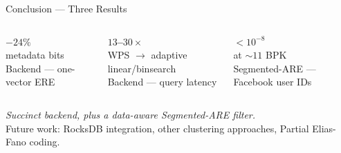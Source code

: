 \begin{frame}{Conclusion — Three Results}
  \begin{columns}[c,onlytextwidth]
    \centering
    {\Huge\bfseries\textcolor{thAccent1}{$-24\%$}}\\[0.4em]
    {\small metadata bits}\\
    {\footnotesize Backend — one-vector ERE}

    \centering
    {\Huge\bfseries\textcolor{thAccent2}{$13$--$30\times$}}\\[0.4em]
    {\small WPS $\to$ adaptive linear/binsearch}\\
    {\footnotesize Backend — query latency}

    \centering
    {\Huge\bfseries\textcolor{thScanARE}{$<\!10^{-8}$}}\\[0.4em]
    {\small at $\sim 11$ BPK}\\
    {\footnotesize Segmented-ARE — Facebook user IDs}
  \end{columns}
  \vspace{1em}
  \centering
  \emph{Succinct backend, plus a data-aware Segmented-ARE filter.}\\
  \vspace{0.5em}
  {\footnotesize Future work: RocksDB integration, other clustering approaches, Partial Elias-Fano coding.}
\end{frame}
